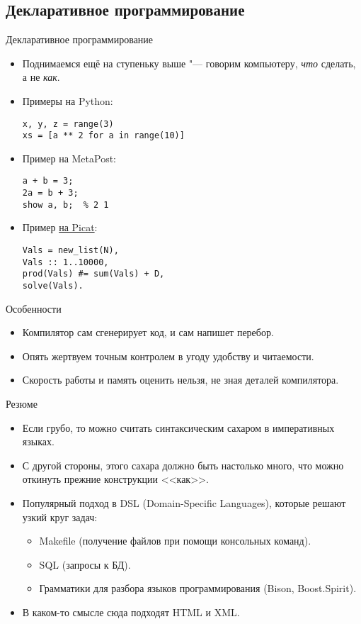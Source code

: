 \subsection{Декларативное программирование}

\begin{frame}[fragile]{Декларативное программирование}
	\begin{itemize}
		\item Поднимаемся ещё на ступеньку выше "--- говорим компьютеру, \textit{что} сделать, а не \textit{как}.
		\item Примеры на Python:
\begin{verbatim}
x, y, z = range(3)
xs = [a ** 2 for a in range(10)]
\end{verbatim}
		\item Пример на MetaPost:
\begin{verbatim}
a + b = 3;
2a = b + 3;
show a, b;  % 2 1
\end{verbatim}
		\item Пример \href{http://codeforces.com/blog/entry/17177}{на Picat}:
\begin{verbatim}
Vals = new_list(N),
Vals :: 1..10000,
prod(Vals) #= sum(Vals) + D,
solve(Vals).
\end{verbatim}
	\end{itemize}
\end{frame}

\begin{frame}{Особенности}
	\begin{itemize}
		\item Компилятор сам сгенерирует код, и сам напишет перебор.
		\item Опять жертвуем точным контролем в угоду удобству и читаемости.
		\item Скорость работы и память оценить нельзя, не зная деталей компилятора.
	\end{itemize}
\end{frame}

\begin{frame}{Резюме}
	\begin{itemize}
		\item Если грубо, то можно считать синтаксическим сахаром в императивных языках.
		\item С другой стороны, этого сахара должно быть настолько много, что можно откинуть прежние конструкции <<как>>.
		\item Популярный подход в DSL (Domain-Specific Languages), которые решают узкий круг задач:
			\begin{itemize}
				\item Makefile (получение файлов при помощи консольных команд).
				\item SQL (запросы к БД).
				\item Грамматики для разбора языков программирования (Bison, Boost.Spirit).
			\end{itemize}
		\item В каком-то смысле сюда подходят HTML и XML.
	\end{itemize}
\end{frame}

